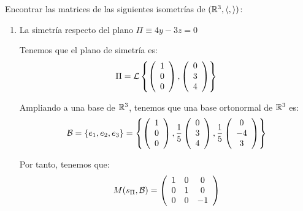 \begin{ejercicio}
    Encontrar las matrices de las siguientes isometrías de $(\mathbb{R}^3, \langle,\rangle)$:
    \begin{enumerate}
        \item La simetría respecto del plano $\Pi\equiv 4y-3z=0$

        Tenemos que el plano de simetría es:
        \begin{equation*}
            \Pi = \mathcal{L}\left\{
            \left(\begin{array}{c}
                     1 \\ 0 \\ 0
                \end{array}\right),
                \left(\begin{array}{c}
                     0 \\ 3 \\ 4
                \end{array}\right)
            \right\}
        \end{equation*}

        Ampliando a una base de $\mathbb{R}^3$, tenemos que una base ortonormal de $\mathbb{R}^3$ es:
        \begin{equation*}
            \mathcal{B} = \{e_1, e_2, e_3\} = \left\{
                \left(\begin{array}{c}
                     1 \\ 0 \\ 0
                \end{array}\right),\frac{1}{5}
                \left(\begin{array}{c}
                     0 \\ 3 \\ 4
                \end{array}\right),\frac{1}{5}
                \left(\begin{array}{c}
                     0 \\ -4 \\ 3
                \end{array}\right)
            \right\}
        \end{equation*}


        Por tanto, tenemos que:
        \begin{equation*}
            M(s_{\Pi}, \mathcal{B}) =\left(\begin{array}{ccc}
                     1 & 0 & 0 \\
                     0 & 1 & 0 \\
                     0 & 0 & -1
                \end{array}\right)
        \end{equation*}


\end{enumerate}
\end{ejercicio}
